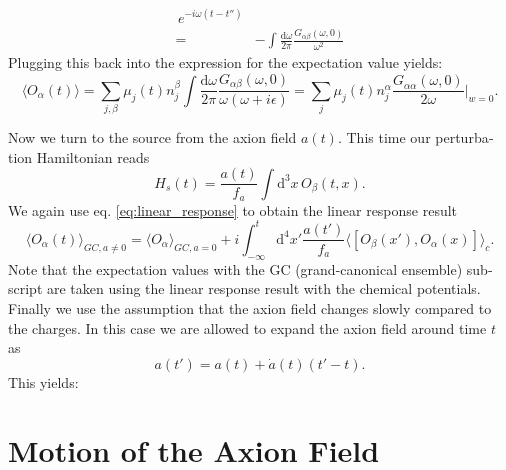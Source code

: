 \documentclass[master,       %
               twoside,        %
               BCOR10mm,       %
               english,ngerman, %
               ]{GAUBM}
\begin{document}
\begin{otherlanguage}{english}
\begin{align}
	\, e^{- i \omega (t - t'')}  \nonumber \\
	= & - \int \frac{\mathrm{d} \omega}{2 \pi} \frac{G_{\alpha \beta}(\omega, 0)} {\omega^2}
\end{align}
Plugging this back into the expression for the expectation value yields:
\begin{equation}
	\langle O_\alpha(t) \rangle = \sum_{j, \beta} \mu_j(t) n^\beta_j \int \frac{\mathrm{d} \omega}{2 \pi} \frac{G_{\alpha \beta}(\omega, 0)} { \omega (\omega + i \epsilon)} =  \sum_{j} \mu_j(t) n^\alpha_j \frac{G_{\alpha \alpha}(\omega, 0)}{2 \omega} \Big|_{w = 0}.
\end{equation}

Now we turn to the source from the axion field $a(t)$.
This time our perturbation Hamiltonian reads
\begin{equation}
	H_s(t) = \frac{a(t)}{f_a} \int \mathrm{d}^3 x \, O_\beta(t, x).
\end{equation}
We again use eq. \eqref{eq:linear_response} to obtain the linear response result
\begin{equation}
	\langle O_\alpha(t) \rangle_{GC, a \ne 0} = \langle O_\alpha \rangle_{GC, a = 0} + i \int_{-\infty}^t \mathrm{d}^4 x' \frac{a(t')}{f_a} \langle [ O_\beta(x'), O_\alpha(x)] \rangle_c.
\end{equation}
Note that the expectation values with the GC (grand-canonical ensemble) subscript are taken using the linear response result with the chemical potentials.
Finally we use the assumption that the axion field changes slowly compared to the charges. In this case we are allowed to expand the axion field
around time $t$ as
\begin{equation}
	a(t') = a(t) + \dot{a}(t)(t' - t).
\end{equation}
This yields:





\chapter{Motion of the Axion Field}
\label{sec:motion_of_the_axion_field}


\end{otherlanguage}
\end{document}
